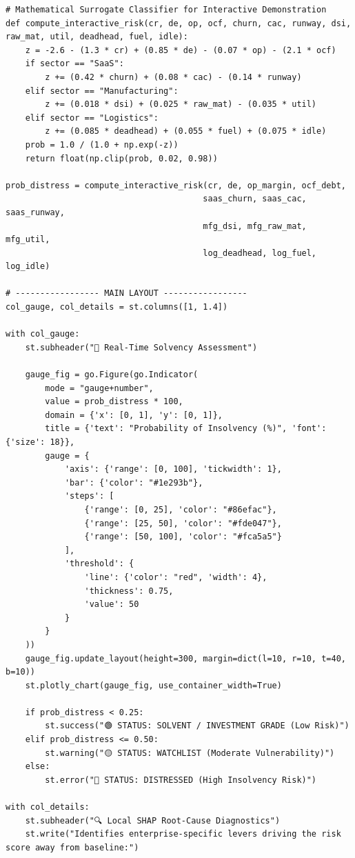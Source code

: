 \documentclass[11pt, a4paper]{article}
\begin{document}
\begin{verbatim}
# Mathematical Surrogate Classifier for Interactive Demonstration
def compute_interactive_risk(cr, de, op, ocf, churn, cac, runway, dsi, raw_mat, util, deadhead, fuel, idle):
    z = -2.6 - (1.3 * cr) + (0.85 * de) - (0.07 * op) - (2.1 * ocf)
    if sector == "SaaS":
        z += (0.42 * churn) + (0.08 * cac) - (0.14 * runway)
    elif sector == "Manufacturing":
        z += (0.018 * dsi) + (0.025 * raw_mat) - (0.035 * util)
    elif sector == "Logistics":
        z += (0.085 * deadhead) + (0.055 * fuel) + (0.075 * idle)
    prob = 1.0 / (1.0 + np.exp(-z))
    return float(np.clip(prob, 0.02, 0.98))

prob_distress = compute_interactive_risk(cr, de, op_margin, ocf_debt, 
                                        saas_churn, saas_cac, saas_runway,
                                        mfg_dsi, mfg_raw_mat, mfg_util,
                                        log_deadhead, log_fuel, log_idle)

# ----------------- MAIN LAYOUT -----------------
col_gauge, col_details = st.columns([1, 1.4])

with col_gauge:
    st.subheader("🎯 Real-Time Solvency Assessment")
    
    gauge_fig = go.Figure(go.Indicator(
        mode = "gauge+number",
        value = prob_distress * 100,
        domain = {'x': [0, 1], 'y': [0, 1]},
        title = {'text': "Probability of Insolvency (%)", 'font': {'size': 18}},
        gauge = {
            'axis': {'range': [0, 100], 'tickwidth': 1},
            'bar': {'color': "#1e293b"},
            'steps': [
                {'range': [0, 25], 'color': "#86efac"},
                {'range': [25, 50], 'color': "#fde047"},
                {'range': [50, 100], 'color': "#fca5a5"}
            ],
            'threshold': {
                'line': {'color': "red", 'width': 4},
                'thickness': 0.75,
                'value': 50
            }
        }
    ))
    gauge_fig.update_layout(height=300, margin=dict(l=10, r=10, t=40, b=10))
    st.plotly_chart(gauge_fig, use_container_width=True)
    
    if prob_distress < 0.25:
        st.success("🟢 STATUS: SOLVENT / INVESTMENT GRADE (Low Risk)")
    elif prob_distress <= 0.50:
        st.warning("🟡 STATUS: WATCHLIST (Moderate Vulnerability)")
    else:
        st.error("🔴 STATUS: DISTRESSED (High Insolvency Risk)")

with col_details:
    st.subheader("🔍 Local SHAP Root-Cause Diagnostics")
    st.write("Identifies enterprise-specific levers driving the risk score away from baseline:")
    

\end{verbatim}
\end{document}
